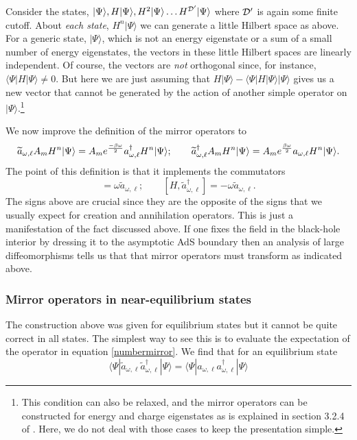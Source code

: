 \documentclass[12pt]{article}
\newcommand{\cop}[1]{#1}
\newcommand{\al}{\cop{A}} %
\def\ta{\widetilde{\cop{a}}}
\newcommand{\be}{\begin{equation}}
\newcommand{\ee}{\end{equation}}
\begin{document}
Consider the states, $|\Psi \rangle, H |\Psi \rangle, H^2 |\Psi \rangle \ldots H^{\cal D'} |\Psi \rangle$ where ${\cal D}'$ is again some finite cutoff. About {\em each state}, $H^n |\Psi \rangle$ we can generate a little Hilbert space as above. For a generic state, $|\Psi \rangle$, which is not an energy eigenstate or a sum of a small number of energy eigenstates, the vectors in these little Hilbert spaces are linearly independent. Of course, the vectors are {\em not} orthogonal since, for instance, $\langle \Psi | H |\Psi \rangle \neq 0$. But here we are just assuming that $H |\Psi \rangle - \langle \Psi| H  | \Psi \rangle |\Psi \rangle$ gives us a new vector that cannot be generated by the action of another simple operator on $|\Psi \rangle$.\footnote{This condition can also be relaxed, and the mirror operators can be constructed for energy and charge eigenstates as is explained in section 3.2.4 of  \cite{Papadodimas:2013jku}. Here, we do not deal with those cases to keep the presentation simple.}

We now improve the definition of the mirror operators to
\be
\label{acthn}
\ta_{\omega, \ell} \al_m H^n |\Psi \rangle = \al_m e^{-\beta \omega \over 2} a_{\omega, \ell}^{\dagger} H^n |\Psi \rangle; \qquad \ta_{\omega, \ell}^{\dagger} \al_m H^n |\Psi \rangle = \al_m e^{\beta \omega \over 2} a_{\omega, \ell} H^n |\Psi \rangle.
\ee
The point of this definition is that it implements the commutators
\be
[H, \ta_{\omega, \ell}] = \omega \ta_{\omega, \ell}; \qquad [H, \ta_{\omega, \ell}^{\dagger}] = -\omega \ta_{\omega, \ell}.
\ee
The signs above are crucial since they are the opposite of the signs that we usually expect for creation and annihilation operators. This is just a manifestation of the fact discussed above. If one fixes the field in the black-hole interior by dressing it to the asymptotic AdS boundary then an analysis of large diffeomorphisms tells us that that mirror operators must transform as indicated above.

\subsubsection{\bf Mirror operators in near-equilibrium states}
The construction above was given for equilibrium states but it cannot be quite correct in all states. The simplest way to see this is to evaluate the expectation of the operator in equation \eqref{numbermirror}. We find that for an equilibrium state
\be
\label{notalwayseq}
\langle \Psi | \ta_{\omega, \ell} \ta_{\omega, \ell}^{\dagger} |\Psi \rangle = \langle \Psi | a_{\omega, \ell} a_{\omega, \ell}^{\dagger} |\Psi \rangle
\ee
\end{document}
